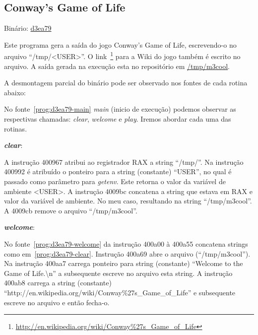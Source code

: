 \subsection{Conway's Game of Life}
Binário: \href{https://s3.amazonaws.com/chaordic-desafio-cloud/d3ea79}{d3ea79}

Este programa gera a saída do jogo Conway's Game of Life,
escrevendo-o no arquivo ``/tmp/<USER>''. O
link~\footnote{\href{http://en.wikipedia.org/wiki/Conway\%27s\_Game\_of\_Life}{http://en.wikipedia.org/wiki/Conway\%27s\_Game\_of\_Life}}
para a Wiki do jogo também é escrito no arquivo. A saída gerada na
execução esta no repositório em
\href{https://github.com/alessandro11/desafio-1/blob/master/m3cool}{/tmp/m3cool}.

A desmontagem parcial do binário pode ser observado nos
fontes de cada rotina abaixo:



No fonte~\ref{prog:d3ea79-main} \emph{main} (inicio de execução)
podemos observar as respectivas chamadas: \emph{clear}, \emph{welcome}
e \emph{play}. Iremos abordar cada uma das rotinas.\\

\par\textbf{\emph{clear}}:


A instrução 400967 atribui ao registrador RAX
a string ``/tmp/''. Na instrução 400992 é atribuído o ponteiro para a
string (constante) ``USER'', no qual é passado como parâmetro para
\emph{getenv}. Este retorna o valor da variável de ambiente <USER>.
A instrução 4009bc concatena a string que estava em RAX e valor da
variável de ambiente. No meu caso, resultando na string
``/tmp/m3cool''. A 4009cb remove o arquivo ``/tmp/m3cool''.\\

\par\textbf{\emph{welcome}}:


No fonte~\ref{prog:d3ea79-welcome} da instrução 400a00 à 400a55
concatena strings como em~\ref{prog:d3ea79-clear}. Instrução 400a69
abre o arquivo (``/tmp/m3cool''). Na instrução 400aa7 carrega ponteiro
para string (constante) ``Welcome to the Game of Life.\textbackslash n'' a
subsequente escreve no arquivo esta string. A instrução 400ab8 carrega a
string (constante) ``http://en.wikipedia.org/wiki/Conway\%27s\_Game\_of\_Life'' e
subsequente escreve no arquivo e então fecha-o.\\

